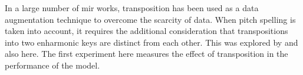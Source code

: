 
In a large number of \gls{mir} works, transposition has been
used as a data augmentation technique to overcome the
scarcity of data. When pitch spelling is taken into account,
it requires the additional consideration that transpositions
into two enharmonic keys are distinct from each other. This
was explored by \textcite{micchi2020not} and also here. The
first experiment here measures the effect of transposition
in the performance of the model.

